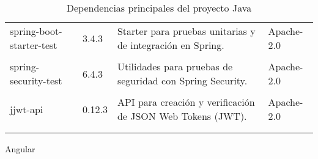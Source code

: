 \begin{longtable}[]{@{}p{}p{}p{}p{}@{}}
    \begin{minipage}[t]{0.18\columnwidth}\raggedright spring-boot-starter-test \end{minipage} & \begin{minipage}[t]{0.10\columnwidth}\raggedright 3.4.3 \end{minipage} & \begin{minipage}[t]{0.49\columnwidth}\raggedright Starter para pruebas unitarias y de integración en Spring. \end{minipage} & \begin{minipage}[t]{0.11\columnwidth}\raggedright Apache-2.0 \end{minipage} \\ \tabularnewline

    \begin{minipage}[t]{0.18\columnwidth}\raggedright spring-security-test \end{minipage} & \begin{minipage}[t]{0.10\columnwidth}\raggedright 6.4.3 \end{minipage} & \begin{minipage}[t]{0.49\columnwidth}\raggedright Utilidades para pruebas de seguridad con Spring Security. \end{minipage} & \begin{minipage}[t]{0.11\columnwidth}\raggedright Apache-2.0 \end{minipage} \\ \tabularnewline

    \begin{minipage}[t]{0.18\columnwidth}\raggedright jjwt-api \end{minipage} & \begin{minipage}[t]{0.10\columnwidth}\raggedright 0.12.3 \end{minipage} & \begin{minipage}[t]{0.49\columnwidth}\raggedright API para creación y verificación de JSON Web Tokens (JWT). \end{minipage} & \begin{minipage}[t]{0.11\columnwidth}\raggedright Apache-2.0 \end{minipage} \\ \tabularnewline

    \bottomrule
    \caption{Dependencias principales del proyecto Java}
\end{longtable}


Angular

